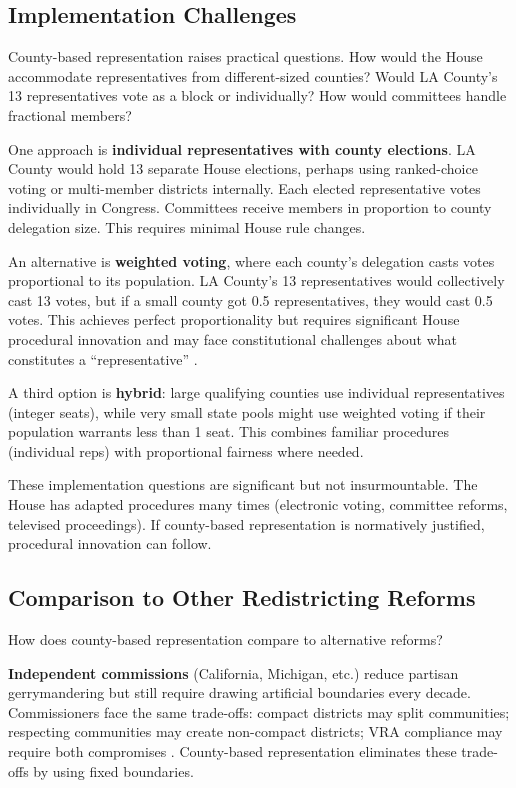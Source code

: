\subsection{Implementation Challenges}

County-based representation raises practical questions. How would the House accommodate representatives from different-sized counties? Would LA County's 13 representatives vote as a block or individually? How would committees handle fractional members?

One approach is \textbf{individual representatives with county elections}. LA County would hold 13 separate House elections, perhaps using ranked-choice voting or multi-member districts internally. Each elected representative votes individually in Congress. Committees receive members in proportion to county delegation size. This requires minimal House rule changes.

An alternative is \textbf{weighted voting}, where each county's delegation casts votes proportional to its population. LA County's 13 representatives would collectively cast 13 votes, but if a small county got 0.5 representatives, they would cast 0.5 votes. This achieves perfect proportionality but requires significant House procedural innovation and may face constitutional challenges about what constitutes a ``representative'' \citep{banzhaf1968power}.

A third option is \textbf{hybrid}: large qualifying counties use individual representatives (integer seats), while very small state pools might use weighted voting if their population warrants less than 1 seat. This combines familiar procedures (individual reps) with proportional fairness where needed.

These implementation questions are significant but not insurmountable. The House has adapted procedures many times (electronic voting, committee reforms, televised proceedings). If county-based representation is normatively justified, procedural innovation can follow.

\subsection{Comparison to Other Redistricting Reforms}

How does county-based representation compare to alternative reforms?

\textbf{Independent commissions} (California, Michigan, etc.) reduce partisan gerrymandering but still require drawing artificial boundaries every decade. Commissioners face the same trade-offs: compact districts may split communities; respecting communities may create non-compact districts; VRA compliance may require both compromises \citep{cain1988reapportionment}. County-based representation eliminates these trade-offs by using fixed boundaries.


